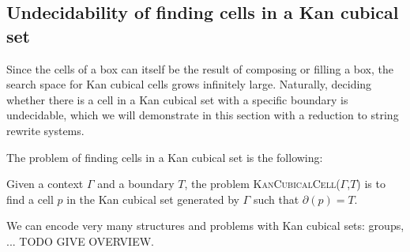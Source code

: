 \documentclass{llncs}
\newcommand{\myproblem}[1]{\textsc{{#1}}}
\newcommand{\smap}[1]{s^{{#1}}}
\newcommand{\cont}[2]{\ensuremath{ \ifthenelse{\equal{#2}{}}{#1}{{#1}\langle{#2}\rangle}} }
\newcommand{\cset}[1]{\ensuremath{\mathsf{{#1}}}}
\newcommand{\boundary}[1]{\partial({#1})}
\begin{document}



\subsection{Undecidability of finding cells in a Kan cubical set}
\label{ssec:kanundecidable}

Since the cells of a box can itself be the result of composing or filling a box,
the search space for Kan cubical cells grows infinitely large. Naturally,
deciding whether there is a cell in a Kan cubical set with a specific boundary
is undecidable, which we will demonstrate in this section with a reduction to
string rewrite systems.

The problem of finding cells in a Kan cubical set is the following:

\begin{definition}
  Given a context $\Gamma$ and a boundary $T$, the problem
  \myproblem{KanCubicalCell}($\Gamma$,$T$) is to find a cell $p$ in the Kan cubical
  set generated by $\Gamma$ such that $\boundary{p} = T$.
\end{definition}

We can encode very many structures and problems with Kan cubical sets: groups,
... TODO GIVE OVERVIEW.
\end{document}

